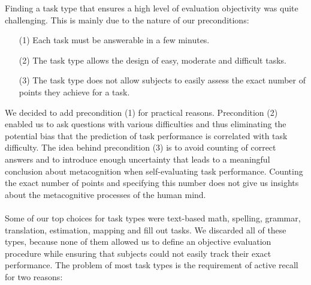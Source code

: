 \documentclass[../main/main.tex]{subfiles}
\begin{document}
	Finding a task type that ensures a high level of evaluation objectivity was quite challenging. This is mainly due to the nature of our preconditions:
	
	\begin{enumerate}
		\item[(1)] Each task must be answerable in a few minutes.
		\item[(2)] The task type allows the design of easy, moderate and difficult tasks.
		\item[(3)] The task type does not allow subjects to easily assess the exact number of points they achieve for a task.
	\end{enumerate}
	
	\noindent We decided to add precondition (1) for practical reasons. Precondition (2) enabled us to ask questions with various difficulties and thus eliminating the potential bias that the prediction of task performance is correlated with task difficulty. The idea behind precondition (3) is to avoid counting of correct answers and to introduce enough uncertainty that leads to a meaningful conclusion about metacognition when self-evaluating task performance. Counting the exact number of points and specifying this number does not give us insights about the metacognitive processes of the human mind.
	\\\\
	Some of our top choices for task types were text-based math, spelling, grammar, translation, estimation, mapping and fill out tasks. We discarded all of these types, because none of them allowed us to define an objective evaluation procedure while ensuring that subjects could not easily track their exact performance. The problem of most task types is the requirement of active recall for two reasons:
	
\end{document}

